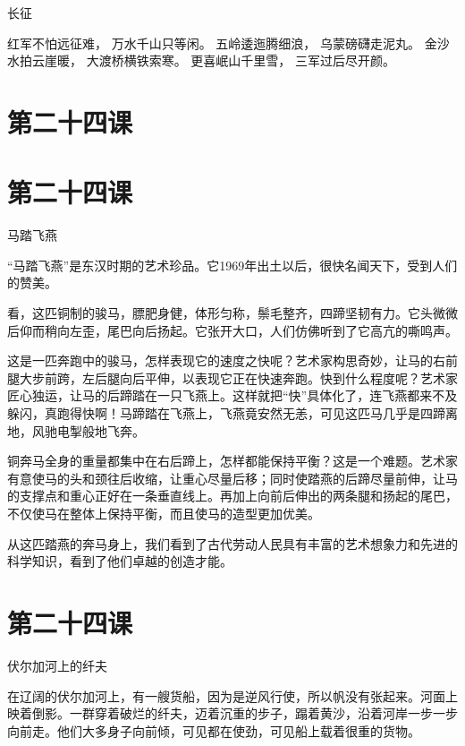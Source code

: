 \documentclass[12pt,UTF8]{ctexbook}
\begin{document}
长征

红军不怕远征难，
万水千山只等闲。
五岭逶迤腾细浪，
乌蒙磅礴走泥丸。
金沙水拍云崖暖，
大渡桥横铁索寒。
更喜岷山千里雪，
三军过后尽开颜。

\section{第二十四课}

\section{第二十四课}

马踏飞燕

“马踏飞燕”是东汉时期的艺术珍品。它1969年出土以后，很快名闻天下，受到人们的赞美。

看，这匹铜制的骏马，膘肥身健，体形匀称，鬃毛整齐，四蹄坚韧有力。它头微微后仰而稍向左歪，尾巴向后扬起。它张开大口，人们仿佛听到了它高亢的嘶鸣声。

这是一匹奔跑中的骏马，怎样表现它的速度之快呢？艺术家构思奇妙，让马的右前腿大步前跨，左后腿向后平伸，以表现它正在快速奔跑。快到什么程度呢？艺术家匠心独运，让马的后蹄踏在一只飞燕上。这样就把“快”具体化了，连飞燕都来不及躲闪，真跑得快啊！马蹄踏在飞燕上，飞燕竟安然无恙，可见这匹马几乎是四蹄离地，风驰电掣般地飞奔。

铜奔马全身的重量都集中在右后蹄上，怎样都能保持平衡？这是一个难题。艺术家有意使马的头和颈往后收缩，让重心尽量后移；同时使踏燕的后蹄尽量前伸，让马的支撑点和重心正好在一条垂直线上。再加上向前后伸出的两条腿和扬起的尾巴，不仅使马在整体上保持平衡，而且使马的造型更加优美。

从这匹踏燕的奔马身上，我们看到了古代劳动人民具有丰富的艺术想象力和先进的科学知识，看到了他们卓越的创造才能。

\section{第二十四课}

伏尔加河上的纤夫

在辽阔的伏尔加河上，有一艘货船，因为是逆风行使，所以帆没有张起来。河面上映着倒影。一群穿着破烂的纤夫，迈着沉重的步子，蹋着黄沙，沿着河岸一步一步向前走。他们大多身子向前倾，可见都在使劲，可见船上载着很重的货物。
\end{document}
